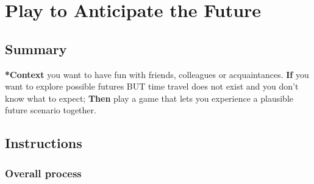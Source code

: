 \documentclass{article}
\begin{document}
\section{Play to Anticipate the Future}
\label{85fefbc1-ca57-46fa-a8b2-154821a56c75}
\subsection{Summary}

\textbf{*Context} you want to have fun with friends, colleagues or
acquaintances. \textbf{If} you want to explore possible futures BUT time travel
does not exist and you don't know what to expect; \textbf{Then} play a game
that lets you experience a plausible future scenario together.

\subsection{Instructions}

\subsubsection{Overall process}
\end{document}
